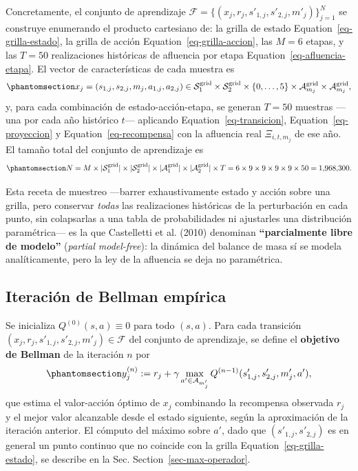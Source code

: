 \documentclass[
  letterpaper,
  DIV=11,
  numbers=noendperiod]{scrreprt}
\theoremstyle{definition}
\theoremstyle{remark}
\begin{document}
Concretamente, el conjunto de aprendizaje
\(\mathcal F=\{(x_j, r_j, s'_{1,j}, s'_{2,j}, m'_j)\}_{j=1}^N\) se
construye enumerando el producto cartesiano de: la grilla de estado
Equation~\ref{eq-grilla-estado}, la grilla de acción
Equation~\ref{eq-grilla-accion}, las \(M=6\) etapas, y las \(T=50\)
realizaciones históricas de afluencia por etapa
Equation~\ref{eq-afluencia-etapa}. El vector de características de cada
muestra es
\begin{equation}\protect\phantomsection\label{eq-caracteristicas}{
x_j = (s_{1,j}, s_{2,j}, m_j, a_{1,j}, a_{2,j}) \in \mathcal S_1^{\text{grid}}\times\mathcal S_2^{\text{grid}}\times\{0,\dots,5\}\times\mathcal A^{\text{grid}}_{m_j}\times\mathcal A^{\text{grid}}_{m_j},
}\end{equation} y, para cada combinación de estado-acción-etapa, se
generan \(T=50\) muestras ---una por cada año histórico \(t\)---
aplicando Equation~\ref{eq-transicion}, Equation~\ref{eq-proyeccion} y
Equation~\ref{eq-recompensa} con la afluencia real \(\Xi_{i,t,m_j}\) de
ese año. El tamaño total del conjunto de aprendizaje es
\begin{equation}\protect\phantomsection\label{eq-tamano-N}{
N = M\times|\mathcal S_1^{\text{grid}}|\times|\mathcal S_2^{\text{grid}}|\times|\mathcal A_1^{\text{grid}}|\times|\mathcal A_2^{\text{grid}}|\times T = 6\times9\times9\times9\times9\times50 = 1{,}968{,}300.
}\end{equation}

Esta receta de muestreo ---barrer exhaustivamente estado y acción sobre
una grilla, pero conservar \emph{todas} las realizaciones históricas de
la perturbación en cada punto, sin colapsarlas a una tabla de
probabilidades ni ajustarles una distribución paramétrica--- es la que
Castelletti et al. (2010) denominan \textbf{``parcialmente libre de
modelo''} (\emph{partial model-free}): la dinámica del balance de masa
sí se modela analíticamente, pero la ley de la afluencia se deja no
paramétrica.

\subsection{Iteración de Bellman
empírica}\label{iteraciuxf3n-de-bellman-empuxedrica-1}

Se inicializa \(Q^{(0)}(s,a) \equiv 0\) para todo \((s,a)\). Para cada
transición \((x_j,r_j,s'_{1,j},s'_{2,j},m'_j)\in\mathcal F\) del
conjunto de aprendizaje, se define el \textbf{objetivo de Bellman} de la
iteración \(n\) por
\begin{equation}\protect\phantomsection\label{eq-objetivo-bellman}{
y^{(n)}_j := r_j + \gamma \max_{a'\in\mathcal A_{m_j'}} Q^{(n-1)}(s'_{1,j},s'_{2,j},m_j',a'),
}\end{equation} que estima el valor-acción óptimo de \(x_j\) combinando
la recompensa observada \(r_j\) y el mejor valor alcanzable desde el
estado siguiente, según la aproximación de la iteración anterior. El
cómputo del máximo sobre \(a'\), dado que \((s'_{1,j},s'_{2,j})\) es en
general un punto continuo que no coincide con la grilla
Equation~\ref{eq-grilla-estado}, se describe en la Sec.
Section~\ref{sec-max-operador}.
\end{document}

